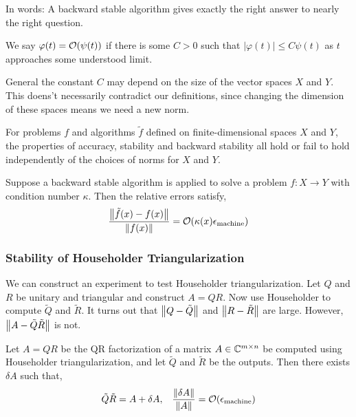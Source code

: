 \documentclass[12pt]{article}
\begin{document}
In words: A backward stable algorithm gives exactly the right answer to nearly the right question.

\begin{definition}
We say \( \varphi(t)  = \mathcal{O}(\psi(t)) \) if there is some \( C>0 \) such that \( |\varphi(t)| \leq C \psi(t) \) as \( t \) approaches some understood limit.
\end{definition}

General the constant \( C \) may depend on the size of the vector spaces \( X \) and \( Y \). This doens't necessarily contradict our definitions, since changing the dimension of these spaces means we need a new norm.

\begin{theorem}
For problems \( f \) and algorithms \( \tilde{f} \) defined on finite-dimensional spaces \( X \) and \( Y \), the properties of accuracy, stability and backward stability all hold or fail to hold independently of the choices of norms for \( X \) and \( Y \).
\end{theorem}


\begin{theorem}
Suppose a backward stable algorithm is applied to solve a problem \( f:X\to Y \) with condition number \( \kappa \). Then the relative errors satisfy,
\begin{align*}
    \dfrac{\left\lVert\tilde{f}(x)-f(x)\right\rVert}{\left\lVert f(x)\right\rVert} = \mathcal{O}(\kappa(x) \epsilon_{\text{machine}})
\end{align*}
\end{theorem}

\subsubsection{Stability of Householder Triangularization}

We can construct an experiment to test Householder triangularization. Let \( Q \) and \( R \) be unitary and triangular and construct \( A = QR \). Now use Householder to compute \( \tilde{Q} \) and \( \tilde{R} \). It turns out that \( \left\lVert Q-\tilde{Q}\right\rVert \) and \( \left\lVert R-\tilde{R}\right\rVert \) are large. However, \( \left\lVert A-\tilde{Q}\tilde{R}\right\rVert \) is not.

\begin{theorem}
Let \( A = QR \) be the QR factorization of a matrix \( A\in\mathbb{C}^{m\times n} \) be computed using Householder triangularization, and let \( \tilde{Q} \) and \( \tilde{R} \) be the outputs. Then there exists \( \delta A \) such that,
\begin{align*}
    \tilde{Q}\tilde{R} = A + \delta A, && \dfrac{\left\lVert\delta A\right\rVert}{\left\lVert A\right\rVert} = \mathcal{O}(\epsilon_\text{machine})
\end{align*}
\end{theorem}
\end{document}
